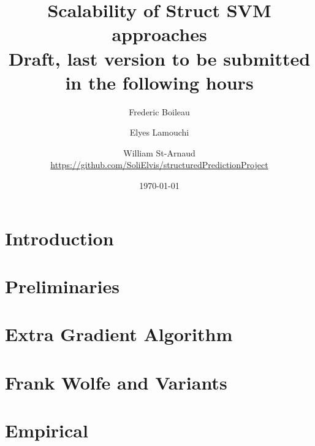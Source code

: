 
\usepackage{graphicx} %
\graphicspath{{figures/}} %
\usepackage[
  backend=biber,
  citestyle=authoryear-ibid,
  natbib=true
  ]{biblatex}
\usepackage{csquotes}
\usepackage{comment}

\usepackage{fancyhdr}
\pagestyle{fancyplain}
\fancyhf{}
\rhead{ \fancyplain{}{\today} }
\rfoot{ \fancyplain{}{\thepage} }
\renewcommand\nameyeardelim{, }

\usepackage[toc,page]{appendix}



\title{Scalability of Struct SVM approaches\\Draft, last version to be submitted
  in the following hours }
\date{\today}
\author{Frederic Boileau \and Elyes Lamouchi \and William St-Arnaud \\
\url{https://github.com/SoliElvis/structuredPredictionProject}}

\maketitle

\clearpage
\tableofcontents
\clearpage
\section{Introduction}

% 

\clearpage
\section{Preliminaries}

% 

\clearpage
\section{Extra Gradient Algorithm}

\clearpage
\section{Frank Wolfe and Variants}

\clearpage


\clearpage
\section{Empirical}

% 

